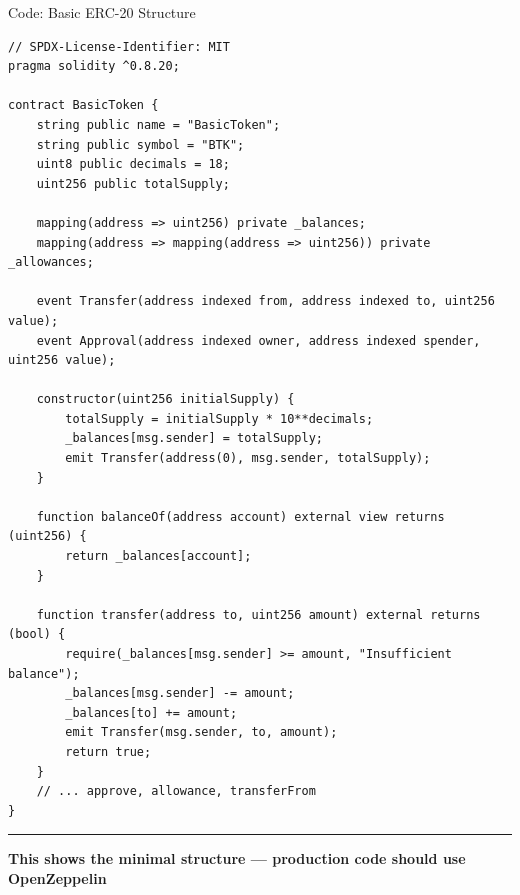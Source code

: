 \documentclass[8pt,aspectratio=169]{beamer}
\newcommand{\bottomnote}[1]{%
\vfill
\vspace{-2mm}
\textcolor{mllavender2}{\rule{\textwidth}{0.4pt}}
\vspace{1mm}
\footnotesize
\textbf{#1}
}
\begin{document}
\begin{frame}[t,fragile]{Code: Basic ERC-20 Structure}
\begin{lstlisting}[style=solidity]
// SPDX-License-Identifier: MIT
pragma solidity ^0.8.20;

contract BasicToken {
    string public name = "BasicToken";
    string public symbol = "BTK";
    uint8 public decimals = 18;
    uint256 public totalSupply;

    mapping(address => uint256) private _balances;
    mapping(address => mapping(address => uint256)) private _allowances;

    event Transfer(address indexed from, address indexed to, uint256 value);
    event Approval(address indexed owner, address indexed spender, uint256 value);

    constructor(uint256 initialSupply) {
        totalSupply = initialSupply * 10**decimals;
        _balances[msg.sender] = totalSupply;
        emit Transfer(address(0), msg.sender, totalSupply);
    }

    function balanceOf(address account) external view returns (uint256) {
        return _balances[account];
    }

    function transfer(address to, uint256 amount) external returns (bool) {
        require(_balances[msg.sender] >= amount, "Insufficient balance");
        _balances[msg.sender] -= amount;
        _balances[to] += amount;
        emit Transfer(msg.sender, to, amount);
        return true;
    }
    // ... approve, allowance, transferFrom
}
\end{lstlisting}

\bottomnote{This shows the minimal structure --- production code should use OpenZeppelin}
\end{frame}
\end{document}
